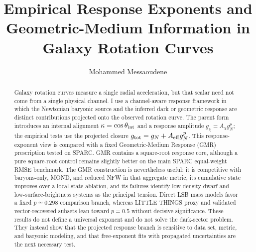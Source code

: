 ﻿\documentclass[twocolumn]{aastex631}
\begin{document}
\pagestyle{plain}
\sloppy
{}

\title{Empirical Response Exponents and Geometric-Medium Information in Galaxy Rotation Curves}
\author[0009-0007-4665-2548]{Mohammed Messaoudene}

\begin{abstract}
Galaxy rotation curves measure a single radial acceleration, but that scalar need not come from a single physical channel.  I use a channel-aware response framework in which the Newtonian baryonic source and the inferred dark or geometric response are distinct contributions projected onto the observed rotation curve.  The parent form introduces an internal alignment $\kappa=\cos\theta_{\rm int}$ and a response amplitude $g_\chi=A_\chi g_N^p$; the empirical tests use the projected closure $g_{\rm tot}=g_N+A_{\rm eff}g_N^p$.  This response-exponent view is compared with a fixed Geometric-Medium Response (GMR) prescription tested on SPARC.  GMR contains a square-root response core, although a pure square-root control remains slightly better on the main SPARC equal-weight RMSE benchmark.  The GMR construction is nevertheless useful: it is competitive with baryons-only, MOND, and reduced NFW in that aggregate metric, its cumulative state improves over a local-state ablation, and its failures identify low-density dwarf and low-surface-brightness systems as the principal tension.  Direct LSB mass models favor a fixed $p\simeq0.298$ comparison branch, whereas LITTLE THINGS proxy and validated vector-recovered subsets lean toward $p=0.5$ without decisive significance.  These results do not define a universal exponent and do not solve the dark-sector problem.  They instead show that the projected response branch is sensitive to data set, metric, and baryonic modeling, and that free-exponent fits with propagated uncertainties are the next necessary test.
\end{abstract}
\end{document}
